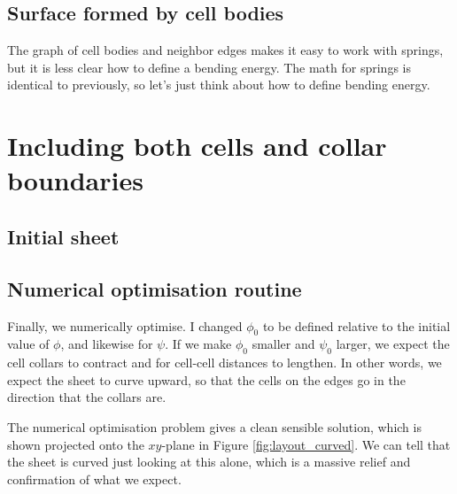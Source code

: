 \subsection{Surface formed by cell bodies}

The graph of cell bodies and neighbor edges makes it easy to work with springs, but it is less clear how to define a bending energy. The math for springs is identical to previously, so let's just think about how to define bending energy.



\section{Including both cells and collar boundaries}

\subsection{Initial sheet}

\subsection{Numerical optimisation routine} \label{subsec:numerical}

Finally, we numerically optimise. I changed $\phi_0$ to be defined relative to the initial value of $\phi$, and likewise for $\psi$. If we make $\phi_0$ smaller and $\psi_0$ larger, we expect the cell collars to contract and for cell-cell distances to lengthen. In other words, we expect the sheet to curve upward, so that the cells on the edges go in the direction that the collars are.

The numerical optimisation problem gives a clean sensible solution, which is shown projected onto the $xy$-plane in Figure \ref{fig:layout_curved}. We can tell that the sheet is curved just looking at this alone, which is a massive relief and confirmation of what we expect.

